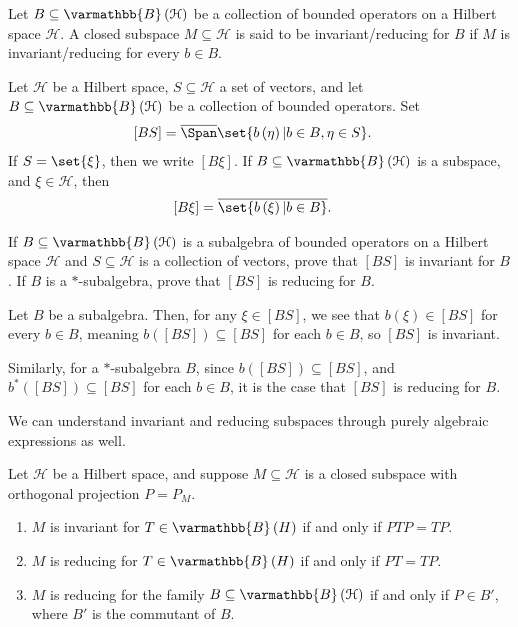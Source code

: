 \documentclass[10pt]{mypackage}
\renewcommand*{\mathbb}[1]{\varmathbb{#1}}
\newcommand{\B}{\mathbb{B}}
\begin{document}
\begin{definition}
  Let $B\subseteq \B\left(\mathcal{H}\right)$ be a collection of bounded operators on a Hilbert space $\mathcal{H}$. A closed subspace $M\subseteq \mathcal{H}$ is said to be invariant/reducing for $B$ if $M$ is invariant/reducing for every $b\in B$.
\end{definition}
\begin{definition}
  Let $\mathcal{H}$ be a Hilbert space, $S\subseteq \mathcal{H}$ a set of vectors, and let $B\subseteq \B\left(\mathcal{H}\right)$ be a collection of bounded operators. Set
  \begin{align*}
    \left[BS\right] &= \overline{\Span}\set{b\left(\eta\right) | b\in B,\eta \in S}.
  \end{align*}
  If $S = \set{\xi}$, then we write $\left[B\xi\right]$. If $B\subseteq \B\left(\mathcal{H}\right)$ is a subspace, and $\xi\in \mathcal{H}$, then
  \begin{align*}
    \left[B\xi\right] &= \overline{\set{b\left(\xi\right) | b\in B}}.
  \end{align*}
\end{definition}
\begin{exercise}
  If $B\subseteq \B\left(\mathcal{H}\right)$ is a subalgebra of bounded operators on a Hilbert space $\mathcal{H}$ and $S\subseteq \mathcal{H}$ is a collection of vectors, prove that $\left[BS\right]$ is invariant for $B$. If $B$ is a $\ast$-subalgebra, prove that $\left[BS\right]$ is reducing for $B$.
\end{exercise}
\begin{solution}
  Let $B$ be a subalgebra. Then, for any $\xi\in \left[BS\right]$, we see that $b\left(\xi\right)\in \left[BS\right]$ for every $b\in B$, meaning $b\left(\left[BS\right]\right)\subseteq \left[BS\right]$ for each $b\in B$, so $\left[BS\right]$ is invariant.\newline

  Similarly, for a $\ast$-subalgebra $B$, since $b\left(\left[BS\right]\right)\subseteq \left[BS\right]$, and $b^{\ast}\left(\left[BS\right]\right)\subseteq \left[BS\right]$ for each $b\in B$, it is the case that $\left[BS\right]$ is reducing for $B$.
\end{solution}
We can understand invariant and reducing subspaces through purely algebraic expressions as well.
\begin{lemma}
  Let $\mathcal{H}$ be a Hilbert space, and suppose $M\subseteq \mathcal{H}$ is a closed subspace with orthogonal projection $P = P_M$.
  \begin{enumerate}[(1)]
    \item $M$ is invariant for $T\in \B\left(H\right)$ if and only if $PTP = TP$.
    \item $M$ is reducing for $T\in \B\left(H\right)$ if and only if $PT = TP$.
    \item $M$ is reducing for the family $B\subseteq \B\left(\mathcal{H}\right)$ if and only if $P\in B'$, where $B'$ is the commutant of $B$.
  \end{enumerate}
\end{lemma}
\end{document}
